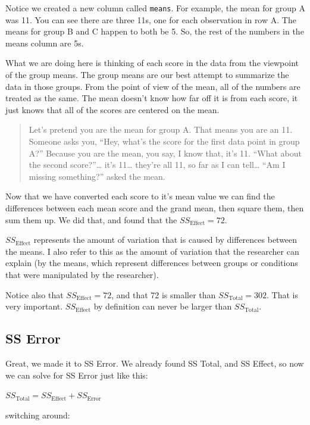 \documentclass[
]{book}
\begin{document}
Notice we created a new column called \texttt{means}. For example, the mean for group A was 11. You can see there are three 11s, one for each observation in row A. The means for group B and C happen to both be 5. So, the rest of the numbers in the means column are 5s.

What we are doing here is thinking of each score in the data from the viewpoint of the group means. The group means are our best attempt to summarize the data in those groups. From the point of view of the mean, all of the numbers are treated as the same. The mean doesn't know how far off it is from each score, it just knows that all of the scores are centered on the mean.

\begin{quote}
Let's pretend you are the mean for group A. That means you are an 11. Someone asks you, ``Hey, what's the score for the first data point in group A?'' Because you are the mean, you say, I know that, it's 11. ``What about the second score?''\ldots{} it's 11\ldots{} they're all 11, so far as I can tell\ldots{} ``Am I missing something?'' asked the mean.
\end{quote}

Now that we have converted each score to it's mean value we can find the differences between each mean score and the grand mean, then square them, then sum them up. We did that, and found that the \(SS_\text{Effect} = 72\).

\(SS_\text{Effect}\) represents the amount of variation that is caused by differences between the means. I also refer to this as the amount of variation that the researcher can explain (by the means, which represent differences between groups or conditions that were manipulated by the researcher).

Notice also that \(SS_\text{Effect} = 72\), and that 72 is smaller than \(SS_\text{Total} = 302\). That is very important. \(SS_\text{Effect}\) by definition can never be larger than \(SS_\text{Total}\).

\subsection{SS Error}\label{ss-error}

Great, we made it to SS Error. We already found SS Total, and SS Effect, so now we can solve for SS Error just like this:

\(SS_\text{Total} = SS_\text{Effect} + SS_\text{Error}\)

switching around:
\end{document}
